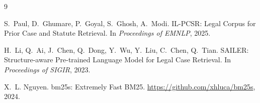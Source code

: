 \documentclass[11pt]{article}
\begin{document}
\begin{thebibliography}{9}

S.~Paul, D.~Ghumare, P.~Goyal, S.~Ghosh, A.~Modi.
\newblock IL-PCSR: Legal Corpus for Prior Case and Statute Retrieval.
\newblock In \emph{Proceedings of EMNLP}, 2025.

H.~Li, Q.~Ai, J.~Chen, Q.~Dong, Y.~Wu, Y.~Liu, C.~Chen, Q.~Tian.
\newblock SAILER: Structure-aware Pre-trained Language Model for Legal Case Retrieval.
\newblock In \emph{Proceedings of SIGIR}, 2023.

X.~L. Nguyen.
\newblock bm25s: Extremely Fast BM25.
\newblock \url{https://github.com/xhluca/bm25s}, 2024.

\end{thebibliography}
\end{document}
